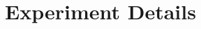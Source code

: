 \documentclass[11pt]{article}
\begin{document}
%
%
%
%
%
%


\section{Experiment Details}
\end{document}
